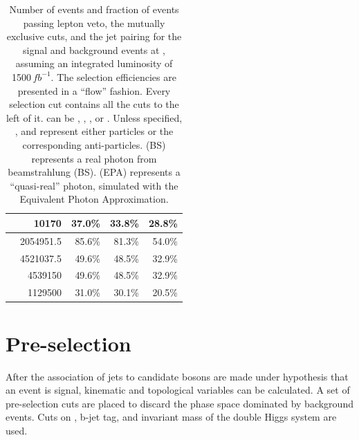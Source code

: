 \begin{table}[!tbp]
\begin{tabular}{lrrrr}
\egamma{\Pepm}{\Pphoton}{\EPA}{\Pquark \Pquark \PHiggs \Pnu} & 10170  & 37.0\% & 33.8\% & 28.8\%\\
\hline
\gammagamma{\Pphoton}{\BS}{\Pphoton}{\BS}{ \Pquark \Pquark \Pquark \Pquark}& 2054951.5  & 85.6\%& 81.3\%& 54.0\%\\
\gammagamma{\Pphoton}{\BS}{\Pphoton}{\EPA}{ \Pquark \Pquark \Pquark \Pquark}& 4521037.5  &49.6\%& 48.5\%& 32.9\%\\
\gammagamma{\Pphoton}{\EPA}{\Pphoton}{\BS}{ \Pquark \Pquark \Pquark \Pquark}& 4539150 & 49.6\%& 48.5\%& 32.9\%\\
\gammagamma{\Pphoton}{\EPA}{\Pphoton}{\EPA}{ \Pquark \Pquark \Pquark \Pquark}& 1129500 & 31.0\% & 30.1\% & 20.5\%\\
\hline \hline
\end{tabular}

\caption
{Number of events and fraction of events passing lepton veto, the mutually exclusive cuts, and the jet pairing  for the signal and background events at , assuming an integrated luminosity of 1500\,$fb^{-1}$. The selection efficiencies are presented in a ``flow'' fashion. Every selection cut contains all the cuts to the left of it. \Pquark can be \Pup, \Pdown, \Pstrange, \Pbottom or \Ptop. Unless specified, \Pquark, \Plepton and \Pnu represent either particles or the corresponding anti-particles. \Pphoton(BS) represents a real photon from beamstrahlung (BS). \Pphoton(EPA) represents a ``quasi-real'' photon, simulated with the Equivalent Photon Approximation.}
\label{tab:doubleHiggs1.4TeVPreslection}
\end{table}


\section{Pre-selection}
\label{sec:doubleHiggsPreSelection}

After the association of jets to candidate bosons are made under hypothesis that an event is signal, kinematic and topological variables can be calculated. A set of pre-selection cuts are placed to discard the phase space dominated by background events. Cuts on \pT, b-jet tag, and invariant mass of the double Higgs system are used.

